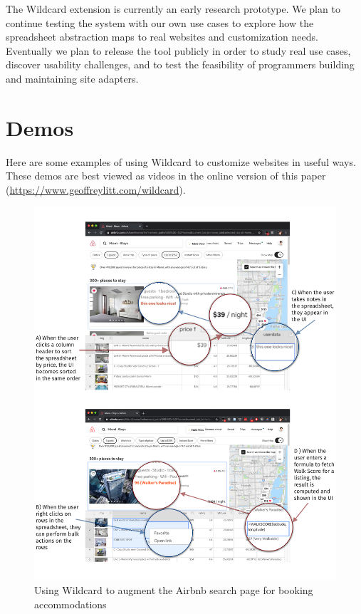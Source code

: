\documentclass[english,submission]{programming}
\begin{document}
The Wildcard extension is currently an early research prototype. We plan
to continue testing the system with our own use cases to explore how the
spreadsheet abstraction maps to real websites and customization needs.
Eventually we plan to release the tool publicly in order to study real
use cases, discover usability challenges, and to test the feasibility of
programmers building and maintaining site adapters.

\hypertarget{sec:demos}{%
\section{Demos}\label{sec:demos}}

Here are some examples of using Wildcard to customize websites in useful
ways.{ These demos are best viewed as videos in the online version of
this paper (\url{https://www.geoffreylitt.com/wildcard}).}

\begin{figure}
\hypertarget{fig:airbnb-demo}{%
\centering
\includegraphics{media/airbnb-demo-300dpi.png}
\caption{Using Wildcard to augment the Airbnb search page for booking
accommodations}\label{fig:airbnb-demo}
}
\end{figure}
\end{document}
